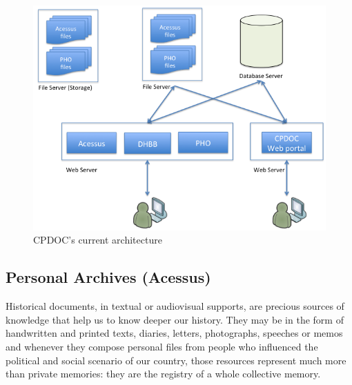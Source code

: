 \begin{figure}[thbp]
  \centering
  \includegraphics[width=.7\textwidth]{cur-architecture.png}
  \caption{CPDOC's current architecture}\label{fig:cpdoc-today}
\end{figure}

\subsection{Personal Archives (Acessus)}

Historical documents, in textual or audiovisual supports, are precious
sources of knowledge that help us to know deeper our history. They may
be in the form of handwritten and printed texts, diaries, letters,
photographs, speeches or memos and whenever they compose personal
files from people who influenced the political and social scenario of
our country, those resources represent much more than private
memories: they are the registry of a whole collective memory.

